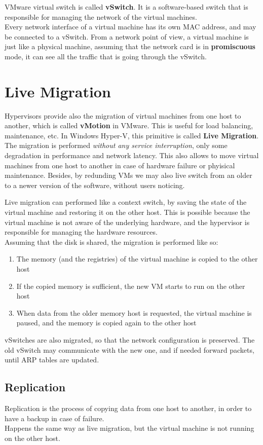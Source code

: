 VMware virtual switch is called \textbf{vSwitch}. It is a software-based switch that is responsible for managing the network of the virtual machines.\\
Every network interface of a virtual machine has its own MAC address, and may be connected to a vSwitch.
From a network point of view, a virtual machine is just like a physical machine, assuming that the network card is in \textbf{promiscuous} mode, it can see all the traffic that is going through the vSwitch.

\section{Live Migration}
Hypervisors provide also the migration of virtual machines from one host to another, which is called \textbf{vMotion} in VMware. This is useful for load balancing, maintenance, etc. In Windows Hyper-V, this primitive is called \textbf{Live Migration}.\\
The migration is performed \textit{without any service interruption}, only some degradation in performance and network latency.
This also allows to move virtual machines from one host to another in case of hardware failure or phyisical maintenance.
Besides, by redunding VMs we may also live switch from an older to a newer version of the software, without users noticing.

Live migration can performed like a context switch, by saving the state of the virtual machine and restoring it on the other host. This is possible because the virtual machine is not aware of the underlying hardware, and the hypervisor is responsible for managing the hardware resources.\\
Assuming that the disk is shared, the migration is performed like so:
\begin{enumerate}
   \item The memory (and the registries) of the virtual machine is copied to the other host
   \item If the copied memory is sufficient, the new VM starts to run on the other host
   \item When data from the older memory host is requested, the virtual machine is paused, and the memory is copied again to the other host
\end{enumerate}

vSwitches are also migrated, so that the network configuration is preserved. The old vSwitch may communicate with the new one, and if needed forward packets, until ARP tables are updated.

\subsection{Replication}
Replication is the process of copying data from one host to another, in order to have a backup in case of failure.\\
Happens the same way as live migration, but the virtual machine is not running on the other host.